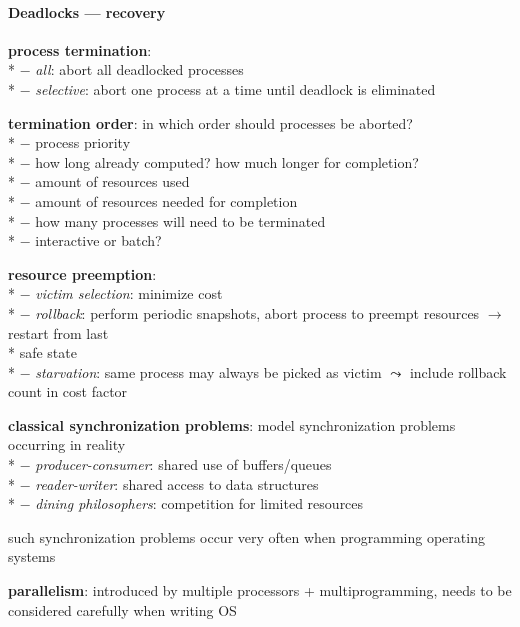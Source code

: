 \paragraph{Deadlocks --- recovery}
\begin{items}
  \item \textbf{process termination}: \\*
    $ - $ \emph{all}: abort all deadlocked processes \\*
    $ - $ \emph{selective}: abort one process at a time until deadlock is eliminated
  \item \textbf{termination order}: in which order should processes be aborted? \\*
    $ - $ process priority \\*
    $ - $ how long already computed? how much longer for completion? \\*
    $ - $ amount of resources used \\*
    $ - $ amount of resources needed for completion \\*
    $ - $ how many processes will need to be terminated \\*
    $ - $ interactive or batch?
  \item \textbf{resource preemption}: \\*
    $ - $ \emph{victim selection}: minimize cost \\*
    $ - $ \emph{rollback}: perform periodic snapshots, abort process to preempt resources $ \to $ restart from last \\* \phantom{$ - $} \phantom{$ \cdot $} safe state \\*
    $ - $ \emph{starvation}: same process may always be picked as victim $ \leadsto $ include rollback count in cost factor
\end{items}

\begin{summary}
  \begin{items}
    \item \textbf{classical synchronization problems}: model synchronization problems occurring in reality \\*
      $ - $ \emph{producer-consumer}: shared use of buffers/queues \\*
      $ - $ \emph{reader-writer}: shared access to data structures \\*
      $ - $ \emph{dining philosophers}: competition for limited resources
    \item such synchronization problems occur very often when programming operating systems
    \item \textbf{parallelism}: introduced by multiple processors + multiprogramming, needs to be considered carefully when writing OS
  \end{items}
\end{summary}